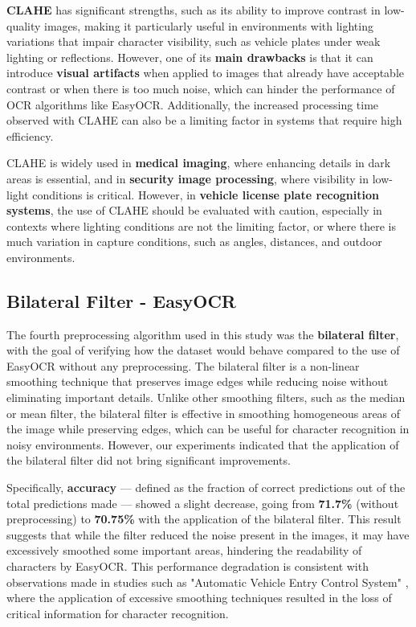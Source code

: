 \documentclass[conference]{IEEEtran}
\begin{document}
	\textbf{CLAHE} has significant strengths, such as its ability to improve contrast in low-quality images, making it particularly useful in environments with lighting variations that impair character visibility, such as vehicle plates under weak lighting or reflections. However, one of its \textbf{main drawbacks} is that it can introduce \textbf{visual artifacts} when applied to images that already have acceptable contrast or when there is too much noise, which can hinder the performance of OCR algorithms like EasyOCR. Additionally, the increased processing time observed with CLAHE can also be a limiting factor in systems that require high efficiency.
	
	CLAHE is widely used in \textbf{medical imaging}, where enhancing details in dark areas is essential, and in \textbf{security image processing}, where visibility in low-light conditions is critical. However, in \textbf{vehicle license plate recognition systems}, the use of CLAHE should be evaluated with caution, especially in contexts where lighting conditions are not the limiting factor, or where there is much variation in capture conditions, such as angles, distances, and outdoor environments.
	
	\subsection{Bilateral Filter - EasyOCR}
	
	The fourth preprocessing algorithm used in this study was the \textbf{bilateral filter}, with the goal of verifying how the dataset would behave compared to the use of EasyOCR without any preprocessing. The bilateral filter is a non-linear smoothing technique that preserves image edges while reducing noise without eliminating important details. Unlike other smoothing filters, such as the median or mean filter, the bilateral filter is effective in smoothing homogeneous areas of the image while preserving edges, which can be useful for character recognition in noisy environments. However, our experiments indicated that the application of the bilateral filter did not bring significant improvements.
	
	Specifically, \textbf{accuracy} — defined as the fraction of correct predictions out of the total predictions made — showed a slight decrease, going from \textbf{71.7\%} (without preprocessing) to \textbf{70.75\%} with the application of the bilateral filter. This result suggests that while the filter reduced the noise present in the images, it may have excessively smoothed some important areas, hindering the readability of characters by EasyOCR. This performance degradation is consistent with observations made in studies such as "Automatic Vehicle Entry Control System" \cite{b9}, where the application of excessive smoothing techniques resulted in the loss of critical information for character recognition.
	
\end{document}
